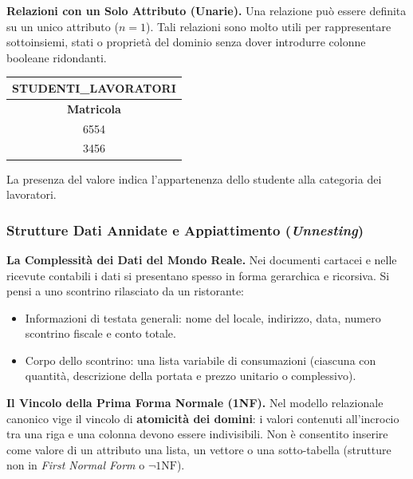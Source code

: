 \documentclass[12pt]{extarticle}
\begin{document}
\medskip
\noindent \textbf{Relazioni con un Solo Attributo (Unarie).} Una relazione può essere definita su un unico attributo ($n=1$). Tali relazioni sono molto utili per rappresentare sottoinsiemi, stati o proprietà del dominio senza dover introdurre colonne booleane ridondanti.
\begin{center}
\small
\begin{tabular}{c}
    \toprule
    \textbf{STUDENTI\_LAVORATORI} \\
    \midrule
    \textbf{Matricola} \\
    \midrule
    6554 \\
    3456 \\
    \bottomrule
\end{tabular}
\end{center}
La presenza del valore indica l'appartenenza dello studente alla categoria dei lavoratori.

\subsubsection{Strutture Dati Annidate e Appiattimento (\textit{Unnesting})}
\noindent \textbf{La Complessità dei Dati del Mondo Reale.} Nei documenti cartacei e nelle ricevute contabili i dati si presentano spesso in forma gerarchica e ricorsiva. Si pensi a uno scontrino rilasciato da un ristorante:
\begin{itemize}
    \item Informazioni di testata generali: nome del locale, indirizzo, data, numero scontrino fiscale e conto totale.
    \item Corpo dello scontrino: una lista variabile di consumazioni (ciascuna con quantità, descrizione della portata e prezzo unitario o complessivo).
\end{itemize}

\medskip
\noindent \textbf{Il Vincolo della Prima Forma Normale (1NF).} Nel modello relazionale canonico vige il vincolo di \textbf{atomicità dei domini}: i valori contenuti all'incrocio tra una riga e una colonna devono essere indivisibili. Non è consentito inserire come valore di un attributo una lista, un vettore o una sotto-tabella (strutture non in \textit{First Normal Form} o $\neg\text{1NF}$).
\end{document}
